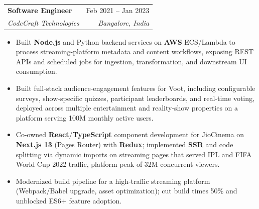 \documentclass[letterpaper,10.5pt]{article}
\makeatletter
\newcommand{\resumeItem}[1]{
  \item\small{{#1 \vspace{-2pt}}}
}
\newcommand{\resumeSubheading}[4]{
  \vspace{1pt}\item
    \begin{tabular*}{0.97\textwidth}[t]{l@{\extracolsep{\fill}}r}
      \textbf{#1} & #2 \\
      \textit{\small#3} & \textit{\small #4} \\
    \end{tabular*}\vspace{-7pt}
}
\newcommand{\resumeItemListStart}{\begin{itemize}}
\newcommand{\resumeItemListEnd}{\end{itemize}\vspace{-5pt}}
\makeatother
\begin{document}

    \resumeSubheading
      {Software Engineer}{Feb 2021 -- Jan 2023}
      {CodeCraft Technologies}{Bangalore, India}
      \resumeItemListStart
        \resumeItem{Built \textbf{Node.js} and Python backend services on \textbf{AWS} ECS/Lambda to process streaming-platform metadata and content workflows, exposing REST APIs and scheduled jobs for ingestion, transformation, and downstream UI consumption.}
        \resumeItem{Built full-stack audience-engagement features for Voot, including configurable surveys, show-specific quizzes, participant leaderboards, and real-time voting, deployed across multiple entertainment and reality-show properties on a platform serving 100M monthly active users.}
        \resumeItem{Co-owned \textbf{React}/\textbf{TypeScript} component development for JioCinema on \textbf{Next.js 13} (Pages Router) with \textbf{Redux}; implemented \textbf{SSR} and code splitting via dynamic imports on streaming pages that served IPL and FIFA World Cup 2022 traffic, platform peak of 32M concurrent viewers.}
        \resumeItem{Modernized build pipeline for a high-traffic streaming platform (Webpack/Babel upgrade, asset optimization); cut build times 50\% and unblocked ES6+ feature adoption.}
    \resumeItemListEnd
        
\end{document}
